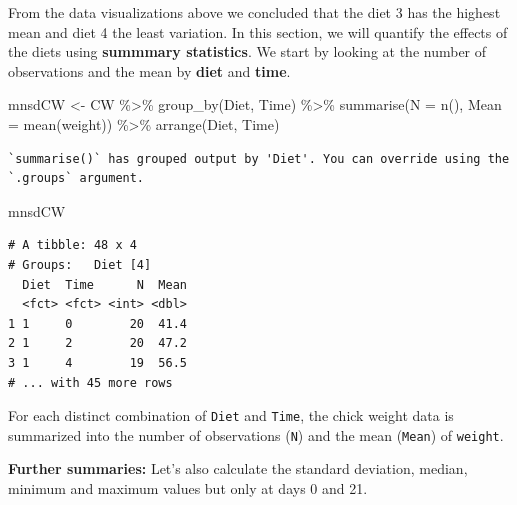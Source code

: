 \documentclass[
  letterpaper,
  DIV=11,
  numbers=noendperiod]{scrreprt}
\newenvironment{Shaded}{\begin{snugshade}}{\end{snugshade}}
\newcommand{\AttributeTok}[1]{\textcolor[rgb]{0.40,0.45,0.13}{#1}}
\newcommand{\FunctionTok}[1]{\textcolor[rgb]{0.28,0.35,0.67}{#1}}
\newcommand{\NormalTok}[1]{\textcolor[rgb]{0.00,0.23,0.31}{#1}}
\newcommand{\OtherTok}[1]{\textcolor[rgb]{0.00,0.23,0.31}{#1}}
\newcommand{\SpecialCharTok}[1]{\textcolor[rgb]{0.37,0.37,0.37}{#1}}
\theoremstyle{definition}
\theoremstyle{plain}
\theoremstyle{plain}
\theoremstyle{remark}
\begin{document}
From the data visualizations above we concluded that the diet 3 has the
highest mean and diet 4 the least variation. In this section, we will
quantify the effects of the diets using \textbf{summmary statistics}. We
start by looking at the number of observations and the mean by
\textbf{diet} and \textbf{time}.

\begin{Shaded}
\begin{Highlighting}[]
\NormalTok{mnsdCW }\OtherTok{\textless{}{-}}\NormalTok{ CW }\SpecialCharTok{\%\textgreater{}\%} 
  \FunctionTok{group\_by}\NormalTok{(Diet, Time) }\SpecialCharTok{\%\textgreater{}\%} 
  \FunctionTok{summarise}\NormalTok{(}\AttributeTok{N =} \FunctionTok{n}\NormalTok{(), }\AttributeTok{Mean =} \FunctionTok{mean}\NormalTok{(weight)) }\SpecialCharTok{\%\textgreater{}\%} 
  \FunctionTok{arrange}\NormalTok{(Diet, Time)}
\end{Highlighting}
\end{Shaded}

\begin{verbatim}
`summarise()` has grouped output by 'Diet'. You can override using the
`.groups` argument.
\end{verbatim}

\begin{Shaded}
\begin{Highlighting}[]
\NormalTok{mnsdCW}
\end{Highlighting}
\end{Shaded}

\begin{verbatim}
# A tibble: 48 x 4
# Groups:   Diet [4]
  Diet  Time      N  Mean
  <fct> <fct> <int> <dbl>
1 1     0        20  41.4
2 1     2        20  47.2
3 1     4        19  56.5
# ... with 45 more rows
\end{verbatim}

For each distinct combination of \texttt{Diet} and \texttt{Time}, the
chick weight data is summarized into the number of observations
(\texttt{N}) and the mean (\texttt{Mean}) of \texttt{weight}.

\textbf{Further summaries:} Let's also calculate the standard deviation,
median, minimum and maximum values but only at days 0 and 21.
\end{document}
